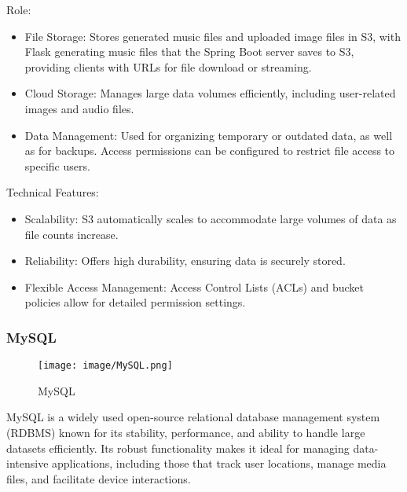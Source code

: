 \documentclass[conference]{IEEEtran}
\begin{document}
Role:
\begin{itemize}
    \item File Storage: Stores generated music files and uploaded image files in S3, with Flask generating music files that the Spring Boot server saves to S3, providing clients with URLs for file download or streaming.\\
    \item Cloud Storage: Manages large data volumes efficiently, including user-related images and audio files.\\
    \item Data Management: Used for organizing temporary or outdated data, as well as for backups. Access permissions can be configured to restrict file access to specific users.\\
\end{itemize}

Technical Features:
\begin{itemize}
    \item Scalability: S3 automatically scales to accommodate large volumes of data as file counts increase.\\
    \item Reliability: Offers high durability, ensuring data is securely stored.\\
    \item Flexible Access Management: Access Control Lists (ACLs) and bucket policies allow for detailed permission settings.\\
\end{itemize}

\subsubsection{MySQL}

\begin{figure}[h!]
    \centering
    \texttt{[image: image/MySQL.png]}
    \caption{MySQL}
    \label{fig:enter-label}
\end{figure}

\noindent MySQL is a widely used open-source relational database management system (RDBMS) known for its stability, performance, and ability to handle large datasets efficiently. Its robust functionality makes it ideal for managing data-intensive applications, including those that track user locations, manage media files, and facilitate device interactions.\\
\end{document}
